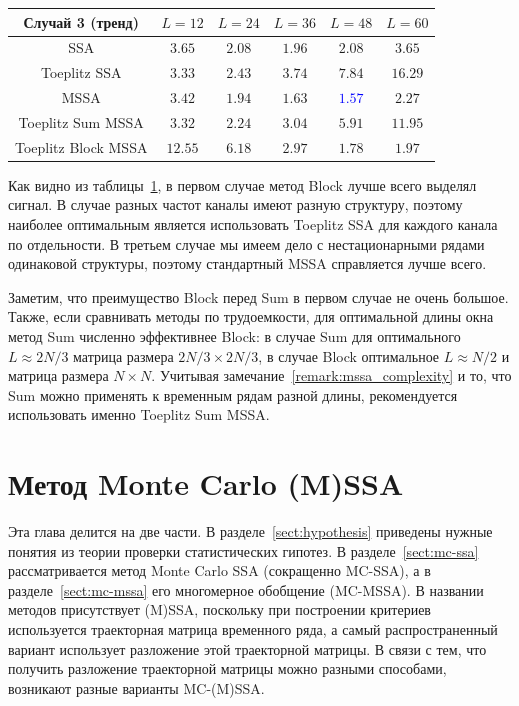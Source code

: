 \documentclass[specialist,
substylefile = spbu.rtx,
               subf,href,colorlinks=true, 12pt]{disser}
\theoremstyle{definition}
\begin{document}
\begin{table}[h]
\begin{tabular}{cccccc}
			\hhline{======}
			Случай 3 (тренд)                 & $L=12$  & $L=24$                     & $L=36$                     & $L=48$                     & $L=60$          \\
			\hline
			SSA                              & $3.65$  & $2.08$                     & $\mathbf{1.96}$            & $2.08$                     & $3.65$          \\
			\hline
			Toeplitz SSA                     & $3.33$  & $\mathbf{2.43}$            & $3.74$                     & $7.84$                     & $16.29$         \\
			\hline
			MSSA                             & $3.42$  & $1.94$                     & $1.63$                     & \textcolor{blue}{${\mathbf{1.57}}$} & $2.27$          \\
			\hline
			Toeplitz Sum MSSA                & $3.32$  & $\mathbf{2.24}$            & $3.04$                     & $5.91$                     & $11.95$         \\
			\hline
			Toeplitz Block MSSA              & $12.55$ & $6.18$                     & $2.97$                     & $\mathbf{1.78}$            & $1.97$          \\
			\hline
		\end{tabular}
	\label{tab:mse}
\end{table}

Как видно из таблицы~\ref{tab:mse}, в первом случае метод Block лучше всего выделял сигнал. В случае разных частот каналы имеют разную структуру, поэтому наиболее оптимальным является использовать Toeplitz SSA для каждого канала по отдельности.  В третьем случае мы имеем дело с нестационарными рядами одинаковой структуры, поэтому стандартный MSSA справляется лучше всего.

Заметим, что преимущество Block перед Sum в первом случае не очень большое. Также, если сравнивать методы по трудоемкости, для оптимальной длины окна метод Sum численно эффективнее Block: в случае Sum для оптимального $L\approx 2N/3$ матрица размера $2N/3\times2N/3$, в случае Block оптимальное $L\approx N/2$ и матрица размера $N\times N$. Учитывая замечание~\ref{remark:mssa_complexity} и то, что Sum можно применять к временным рядам разной длины, рекомендуется использовать именно Toeplitz Sum MSSA.

\chapter{Метод Monte Carlo (M)SSA}\label{chpt:mc-ssa}
Эта глава делится на две части. В разделе~\ref{sect:hypothesis} приведены нужные понятия из теории проверки статистических гипотез. В разделе~\ref{sect:mc-ssa} рассматривается метод Monte Carlo SSA (сокращенно MC-SSA), а в разделе~\ref{sect:mc-mssa} его многомерное обобщение (MC-MSSA). В названии методов присутствует (M)SSA, поскольку при построении критериев используется траекторная матрица временного ряда, а самый распространенный вариант использует разложение этой траекторной матрицы. В связи с тем, что получить разложение траекторной матрицы можно разными способами, возникают разные варианты MC-(M)SSA.
\end{document}
